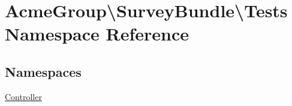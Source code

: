 \hypertarget{namespace_acme_group_1_1_survey_bundle_1_1_tests}{\section{Acme\+Group\textbackslash{}Survey\+Bundle\textbackslash{}Tests Namespace Reference}
\label{namespace_acme_group_1_1_survey_bundle_1_1_tests}
}
\subsection*{Namespaces}
\begin{DoxyCompactItemize}
\item 
 \hyperlink{namespace_acme_group_1_1_survey_bundle_1_1_tests_1_1_controller}{Controller}
\end{DoxyCompactItemize}
